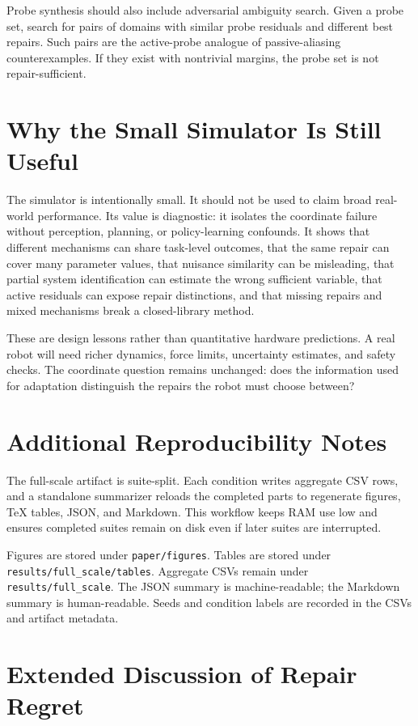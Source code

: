 \documentclass{article}
\begin{document}
Probe synthesis should also include adversarial ambiguity search. Given a probe
set, search for pairs of domains with similar probe residuals and different best
repairs. Such pairs are the active-probe analogue of passive-aliasing
counterexamples. If they exist with nontrivial margins, the probe set is not
repair-sufficient.

\section{Why the Small Simulator Is Still Useful}

The simulator is intentionally small. It should not be used to claim broad
real-world performance. Its value is diagnostic: it isolates the coordinate
failure without perception, planning, or policy-learning confounds. It shows
that different mechanisms can share task-level outcomes, that the same repair
can cover many parameter values, that nuisance similarity can be misleading,
that partial system identification can estimate the wrong sufficient variable,
that active residuals can expose repair distinctions, and that missing repairs
and mixed mechanisms break a closed-library method.

These are design lessons rather than quantitative hardware predictions. A real
robot will need richer dynamics, force limits, uncertainty estimates, and safety
checks. The coordinate question remains unchanged: does the information used for
adaptation distinguish the repairs the robot must choose between?

\section{Additional Reproducibility Notes}

The full-scale artifact is suite-split. Each condition writes aggregate CSV
rows, and a standalone summarizer reloads the completed parts to regenerate
figures, TeX tables, JSON, and Markdown. This workflow keeps RAM use low and
ensures completed suites remain on disk even if later suites are interrupted.

Figures are stored under \texttt{paper/figures}. Tables are stored under
\texttt{results/full\_scale/tables}. Aggregate CSVs remain under
\texttt{results/full\_scale}. The JSON summary is machine-readable; the Markdown
summary is human-readable. Seeds and condition labels are recorded in the CSVs
and artifact metadata.

\section{Extended Discussion of Repair Regret}
\end{document}
